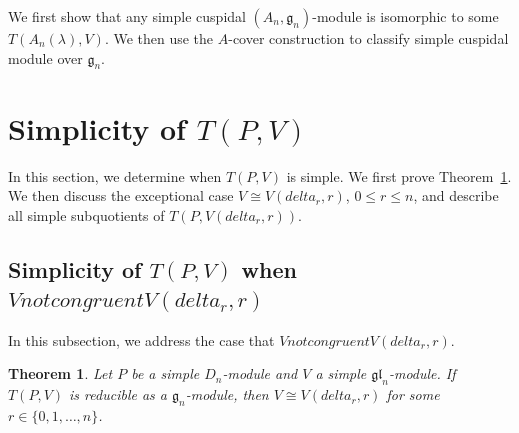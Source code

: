\documentclass[12pt,a4paper]{amsart}
\def\mg{g}%
\def\gl{gl}%
\def\delta{delta}%
\def\ncong{not congruent}%
\newtheorem{theorem}{Theorem}[section]
\numberwithin{equation}{section}
\def\mg{\mathfrak{g}}
\def\gl{\mathfrak{gl}}
\begin{document}
We first show that any simple cuspidal \((A_n,\mg_n)\)-module is
isomorphic to some \(T(A_n(\lambda),V)\). We then use the \(A\)-cover
construction to classify
simple cuspidal module over  $\mg_n$.

\section{Simplicity of $T(P,V)$}

In this section, we determine when \(T(P,V)\) is simple. We first
prove Theorem~\ref{simplicity}. We then discuss the exceptional case
\(V\cong V(\delta_r,r)\), \(0\leq r\leq n\), and describe all simple  subquotients of \(T(P,V(\delta_r,r))\).

\subsection{Simplicity of $T(P,V)$ when $V\ncong  V(\delta_{r},r)$ }

In this subsection, we address the case that $V\ncong  V(\delta_{r},r)$.

\begin{theorem}\label{simplicity}
Let \(P\) be a simple \(D_n\)-module and \(V\) a simple
\(\gl_n\)-module. If \(T(P,V)\) is reducible as a \(\mg_n\)-module,
then \(V\cong V(\delta_r,r)\) for some \(r\in\{0,1,\ldots,n\}\).
\end{theorem}
\end{document}
